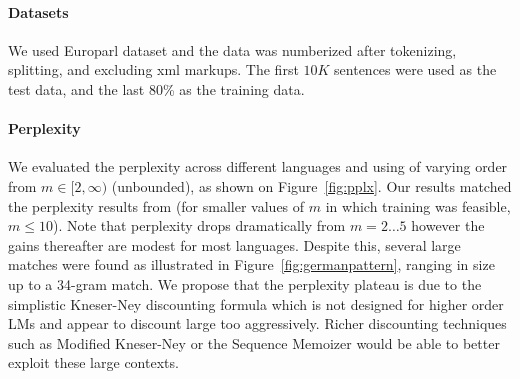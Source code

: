 
\paragraph{Datasets}
We used Europarl dataset and the data was numberized after tokenizing, splitting, and excluding xml markups. The first $10K$ sentences were used as the test data, and the last 80\% as the training data. %


\paragraph{Perplexity}
We evaluated the perplexity across different languages and using \ngrams of varying order from $m\in[2,\infty)$ (unbounded), as shown on Figure~\ref{fig:pplx}.
Our results matched the perplexity results from \SRILM (for smaller values of $m$ in which \SRILM training was feasible, $m \le 10$).
Note that perplexity drops dramatically from $m=2\ldots5$ however the gains thereafter are modest for most languages.
Despite this, several large \ngram matches were found as illustrated in Figure~\ref{fig:germanpattern}, ranging in size up to a 34-gram match.
We propose that the perplexity plateau is due to the simplistic Kneser-Ney discounting formula which is not designed for higher order \ngram LMs and appear to discount large \ngrams too aggressively. 
Richer discounting techniques such as Modified Kneser-Ney \cite{chen1996empirical} or the Sequence Memoizer \cite{wood2011sequence} would be able to better exploit these large contexts.


